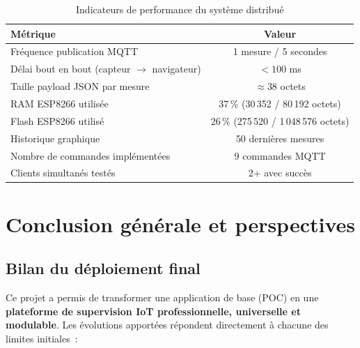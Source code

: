 \documentclass[12pt, a4paper]{report}
\begin{document}
\begin{table}[H]
\centering
\renewcommand{\arraystretch}{1.3}
\begin{tabular}{|l|c|}
\hline
\rowcolor{bleuFonce!10}
\textbf{M\'etrique} & \textbf{Valeur} \\
\hline
Fr\'equence publication MQTT & 1 mesure / 5 secondes \\
\hline
D\'elai bout en bout (capteur $\to$ navigateur) & $< 100$ ms \\
\hline
Taille payload JSON par mesure & $\approx 38$ octets \\
\hline
RAM ESP8266 utilis\'ee & 37\,\% (30\,352 / 80\,192 octets) \\
\hline
Flash ESP8266 utilis\'e & 26\,\% (275\,520 / 1\,048\,576 octets) \\
\hline
Historique graphique & 50 derni\`eres mesures \\
\hline
Nombre de commandes impl\'ement\'ees & 9 commandes MQTT \\
\hline
Clients simultan\'es test\'es & 2+ avec succ\`es \\
\hline
\end{tabular}
\caption{Indicateurs de performance du syst\`eme distribu\'e}
\label{tab:performance}
\end{table}

\chapter{Conclusion g\'en\'erale et perspectives}

\section{Bilan du d\'eploiement final}

Ce projet a permis de transformer une application de base (POC) en
une \textbf{plateforme de supervision IoT professionnelle, universelle
et modulable}. Les \'evolutions apport\'ees r\'epondent directement
\`a chacune des limites initiales~:
\end{document}
